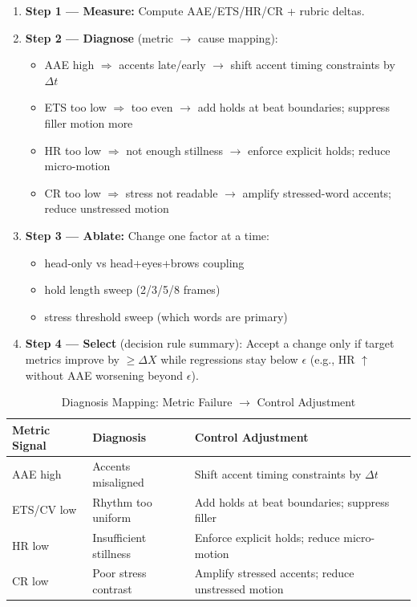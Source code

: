 \documentclass[11pt,a4paper]{article}
\begin{document}
\begin{enumerate}[leftmargin=2em]
    \item \textbf{Step 1 --- Measure:} Compute AAE/ETS/HR/CR + rubric deltas.
    
    \item \textbf{Step 2 --- Diagnose} (metric $\rightarrow$ cause mapping):
    \begin{itemize}
        \item AAE high $\Rightarrow$ accents late/early $\rightarrow$ shift accent timing constraints by $\Delta t$
        \item ETS too low $\Rightarrow$ too even $\rightarrow$ add holds at beat boundaries; suppress filler motion more
        \item HR too low $\Rightarrow$ not enough stillness $\rightarrow$ enforce explicit holds; reduce micro-motion
        \item CR too low $\Rightarrow$ stress not readable $\rightarrow$ amplify stressed-word accents; reduce unstressed motion
    \end{itemize}
    
    \item \textbf{Step 3 --- Ablate:} Change one factor at a time:
    \begin{itemize}
        \item head-only vs head+eyes+brows coupling
        \item hold length sweep (2/3/5/8 frames)
        \item stress threshold sweep (which words are primary)
    \end{itemize}
    
    \item \textbf{Step 4 --- Select} (decision rule summary): Accept a change only if target metrics improve by $\geq \Delta X$ while regressions stay below $\epsilon$ (e.g., HR $\uparrow$ without AAE worsening beyond $\epsilon$).
\end{enumerate}

\begin{table}[H]
\centering
\caption{Diagnosis Mapping: Metric Failure $\rightarrow$ Control Adjustment}
\label{tab:diagnosis-mapping}
\begin{tabular}{@{}p{2.5cm}p{3.5cm}p{5cm}@{}}
\toprule
\textbf{Metric Signal} & \textbf{Diagnosis} & \textbf{Control Adjustment} \\
\midrule
AAE high & Accents misaligned & Shift accent timing constraints by $\Delta t$ \\
ETS/CV low & Rhythm too uniform & Add holds at beat boundaries; suppress filler \\
HR low & Insufficient stillness & Enforce explicit holds; reduce micro-motion \\
CR low & Poor stress contrast & Amplify stressed accents; reduce unstressed motion \\
\bottomrule
\end{tabular}
\end{table}
\end{document}
